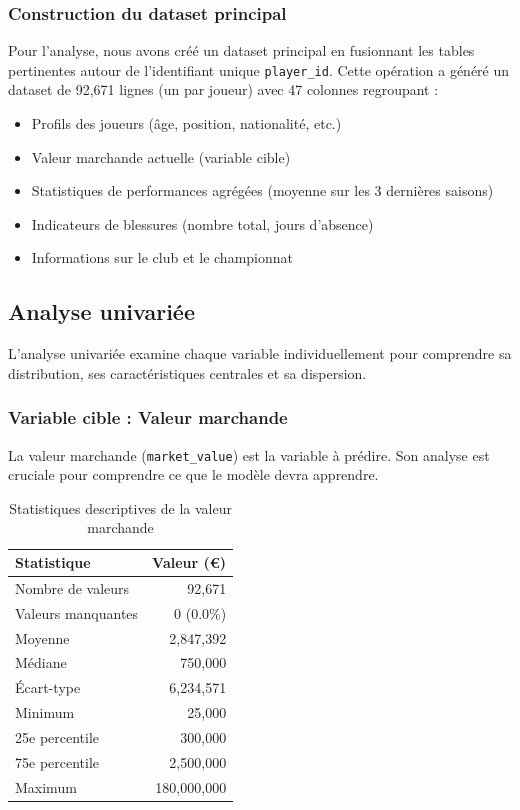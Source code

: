 \documentclass[12pt,a4paper]{article}
\begin{document}
\subsubsection{Construction du dataset principal}

Pour l'analyse, nous avons créé un dataset principal en fusionnant les tables pertinentes autour de l'identifiant unique \texttt{player\_id}. Cette opération a généré un dataset de 92,671 lignes (un par joueur) avec 47 colonnes regroupant :

\begin{itemize}[leftmargin=*]
    \item Profils des joueurs (âge, position, nationalité, etc.)
    \item Valeur marchande actuelle (variable cible)
    \item Statistiques de performances agrégées (moyenne sur les 3 dernières saisons)
    \item Indicateurs de blessures (nombre total, jours d'absence)
    \item Informations sur le club et le championnat
\end{itemize}

\newpage

\subsection{Analyse univariée}

L'analyse univariée examine chaque variable individuellement pour comprendre sa distribution, ses caractéristiques centrales et sa dispersion.

\subsubsection{Variable cible : Valeur marchande}

La valeur marchande (\texttt{market\_value}) est la variable à prédire. Son analyse est cruciale pour comprendre ce que le modèle devra apprendre.

\begin{table}[h]
\centering
\begin{tabular}{@{}lr@{}}
\toprule
\textbf{Statistique} & \textbf{Valeur (€)} \\ \midrule
Nombre de valeurs & 92,671 \\
Valeurs manquantes & 0 (0.0\%) \\
Moyenne & 2,847,392 \\
Médiane & 750,000 \\
Écart-type & 6,234,571 \\
Minimum & 25,000 \\
25e percentile & 300,000 \\
75e percentile & 2,500,000 \\
Maximum & 180,000,000 \\ \bottomrule
\end{tabular}
\caption{Statistiques descriptives de la valeur marchande}
\end{table}
\end{document}
